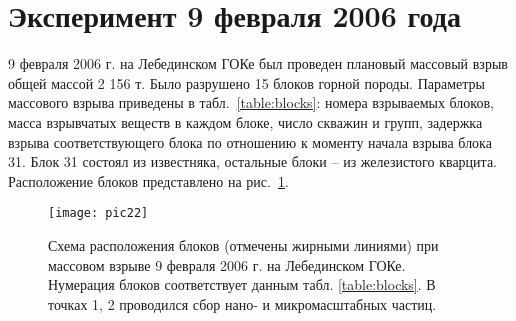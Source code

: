\section{Эксперимент 9 февраля 2006 года} \label{sect2_3}

9 февраля 2006 г. на Лебединском ГОКе был проведен плановый массовый взрыв общей массой 2 156 т. Было разрушено 15 блоков горной породы. Параметры массового взрыва приведены в табл.~\ref{table:blocks}: номера взрываемых блоков, масса взрывчатых веществ в каждом блоке, число скважин и групп, задержка взрыва соответствующего блока по отношению к моменту начала взрыва блока 31. Блок 31 состоял из известняка, остальные блоки – из железистого кварцита. Расположение блоков представлено на рис.~\ref{img:2blocks}.

\begin{figure} [h] 
  \center
  \texttt{[image: pic22]}
  \caption{Схема расположения блоков (отмечены жирными линиями) при массовом взрыве 9 февраля 2006 г. на  Лебединском ГОКе. Нумерация блоков соответствует данным табл. \ref{table:blocks}. В точках 1, 2 проводился сбор нано- и микромасштабных частиц.} 
  \label{img:2blocks}  
\end{figure}

